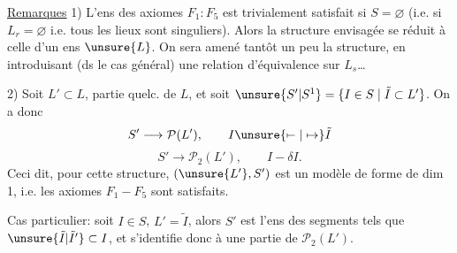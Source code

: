 \uline{Remarques} 1) L'ens des axiomes $F_1:F_5$ est trivialement satisfait si $S=\varnothing$ (i.e. si $L_r=\varnothing$ i.e. tous les lieux sont singuliers).
Alors la structure envisagée se réduit à celle d'un ens $\unsure{L}$.
On sera amené tantôt  un peu la structure, en introduisant (ds le cas général) une relation d'équivalence sur $L_s$\ldots

2) Soit $L'\subset L$, partie quelc. de $L$, et soit $\unsure{S'|S^1}=\{I\in S\mid\tilde I\subset L'\}$. On a donc
\[
S'\longrightarrow\mathcal P(L'),\qquad I\unsure{\mapstochar\relbar|\mapsto}\tilde I
\]
\[
S'\longrightarrow\mathcal P_2(L'),\qquad I-\delta I.
\]
Ceci dit, pour cette structure, $(\unsure{L'},S')$ est un modèle de forme de dim 1, i.e. les axiomes $F_1-F_5$ sont satisfaits.

Cas particulier: soit $I\in S$, $L'=\tilde I$, alors $S'$ est l'ens  des segments tels que $\unsure{\tilde I|\tilde I'}\subset I$, et s'identifie donc à une partie de $\mathcal P_2(L')$.

